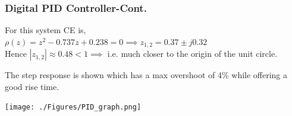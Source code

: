 \documentclass[mathserif, 10pt]{beamer} %
\begin{document}
\frame
{

\small
\frametitle{Digital PID Controller-Cont.}

For this system CE is, \\ \vspace{.07in}
$\rho(z) = z^2-0.737z+0.238 = 0 \implies z_{1,2} = 0.37 \pm j0.32$ \\ \vspace{.07in}
Hence $|z_{1,2}| \approx 0.48 < 1\implies$ i.e. much closer to the origin of the unit circle. \\ \vspace{.07in}

The step response is shown which has a max overshoot of 4\% while offering a good rise time. \\ \vspace{.07in}

\vspace{-.08in}
\hspace{1.6in}
\texttt{[image: ./Figures/PID\_graph.png]}

}
\end{document}
